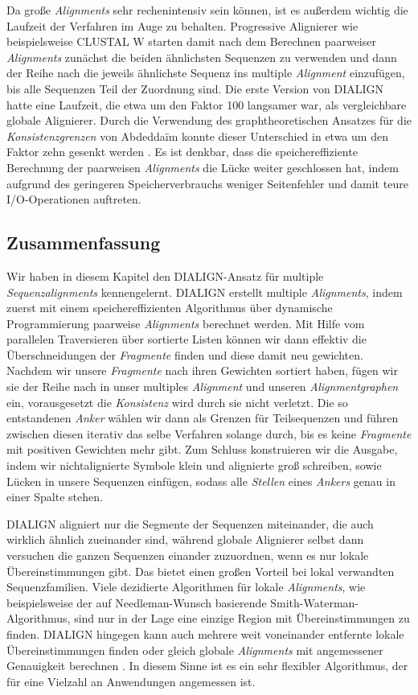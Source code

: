 Da große \emph{Alignments} sehr rechenintensiv sein können, ist es außerdem wichtig die Laufzeit der Verfahren im Auge zu behalten. Progressive Alignierer wie beispielsweise CLUSTAL W starten damit nach dem Berechnen paarweiser \emph{Alignments} zunächst die beiden ähnlichsten Sequenzen zu verwenden und dann der Reihe nach die jeweils ähnlichste Sequenz ins multiple \emph{Alignment} einzufügen, bis alle Sequenzen Teil der Zuordnung sind.  Die erste Version von DIALIGN hatte eine Laufzeit, die etwa um den Faktor 100 langsamer war, als vergleichbare globale Alignierer. Durch die Verwendung des graphtheoretischen Ansatzes für die \emph{Konsistenzgrenzen} von Abdedda\"im konnte dieser Unterschied in etwa um den Faktor zehn gesenkt werden \citep{am00}. Es ist denkbar, dass die speichereffiziente Berechnung der paarweisen \emph{Alignments} die Lücke weiter geschlossen hat, indem aufgrund des geringeren Speicherverbrauchs weniger Seitenfehler und damit teure I/O-Operationen auftreten.


\subsection{Zusammenfassung}

Wir haben in diesem Kapitel den DIALIGN-Ansatz für multiple \emph{Sequenzalignments} kennengelernt. DIALIGN erstellt multiple \emph{Alignments}, indem zuerst mit einem speichereffizienten Algorithmus über dynamische Programmierung paarweise \emph{Alignments} berechnet werden. Mit Hilfe vom parallelen Traversieren über sortierte Listen können wir dann effektiv die Überschneidungen der \emph{Fragmente} finden und diese damit neu gewichten. Nachdem wir unsere \emph{Fragmente} nach ihren Gewichten sortiert haben, fügen wir sie der Reihe nach in unser multiples \emph{Alignment} und unseren \emph{Alignmentgraphen} ein, vorausgesetzt die \emph{Konsistenz} wird durch sie nicht verletzt. Die so entstandenen \emph{Anker} wählen wir dann als Grenzen für Teilsequenzen und führen zwischen diesen iterativ das selbe Verfahren solange durch, bis es keine \emph{Fragmente} mit positiven Gewichten mehr gibt. Zum Schluss konstruieren wir die Ausgabe, indem wir nichtalignierte Symbole klein und alignierte groß schreiben, sowie Lücken in unsere Sequenzen einfügen, sodass alle \emph{Stellen} eines \emph{Ankers} genau in einer Spalte stehen. 

DIALIGN aligniert nur die Segmente der Sequenzen miteinander, die auch wirklich ähnlich zueinander sind, während globale Alignierer selbst dann versuchen die ganzen Sequenzen einander zuzuordnen, wenn es nur lokale Übereinstimmungen gibt. Das bietet einen großen Vorteil bei lokal verwandten Sequenzfamilien. Viele dezidierte Algorithmen für lokale \emph{Alignments}, wie beispielsweise der auf Needleman-Wunsch basierende Smith-Waterman-Algorithmus, sind nur in der Lage eine einzige Region mit Übereinstimmungen zu finden. DIALIGN hingegen kann auch mehrere weit voneinander entfernte lokale Übereinstimmungen finden oder gleich globale \emph{Alignments} mit angemessener Genauigkeit berechnen \citep{mdw96}. In diesem Sinne ist es ein sehr flexibler Algorithmus, der für eine Vielzahl an Anwendungen angemessen ist. 

